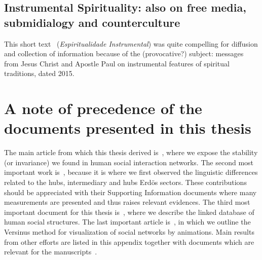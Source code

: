 \begin{apendicesenv}
\subsection{Instrumental Spirituality: also on free media, submidialogy and counterculture}
This short text~\cite{insp} (\emph{Espiritualidade Instrumental})
was quite compelling for diffusion and collection of information
because of the (provocative?) subject:
messages from Jesus Christ and Apostle Paul on instrumental features of spiritual traditions,
dated 2015.

\section{A note of precedence of the documents presented in this thesis}
The main article from which this thesis derived is~\cite{stab},
where we expose the stability (or invariance) we found in human social interaction networks.
The second most important work is~\cite{rcText}, because it is where we
first observed the linguistic differences related to the hubs, intermediary and hubs
Erd\"os sectors.
These contributions should be appreciated with their Supporting Information documents
where many measurements are presented and thus raises relevant evidences.
The third most important document for this thesis is~\cite{losd}, where we
describe the linked database of human social structures.
The last important article is~\cite{versinus}, in which we outline the Versinus method for visualization
of social networks by animations.
Main results from other efforts are listed in this appendix together with documents which
are relevant for the manuscripts~\cite{stab,rcText,losd,versinus}.

\end{apendicesenv}
